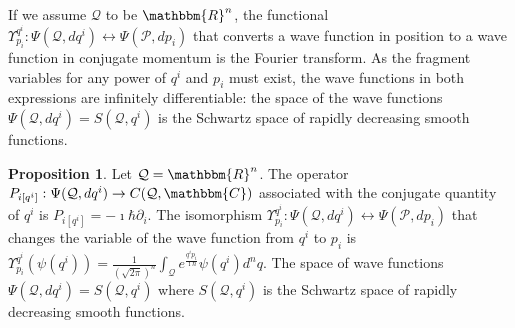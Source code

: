 \documentclass[aps,pra,10pt,twocolumn,floatfix,nofootinbib]{revtex4-1}
\numberwithin{equation}{section}
\theoremstyle{definition}
\newtheorem{prop}[equation]{Proposition}
\begin{document}
If we assume $\mathcal{Q}$ to be $\mathbbm{R}^n$, the functional $\Upsilon^{q^i}_{p_i} : \Psi(\mathcal{Q}, dq^i) \leftrightarrow \Psi(\mathcal{P}, dp_i)$ that converts a wave function in position to a wave function in conjugate momentum is the Fourier transform. As the fragment variables for any power of $q^i$ and $p_i$ must exist, the wave functions in both expressions are infinitely differentiable: the space of the wave functions $\Psi(\mathcal{Q}, dq^i) = S(\mathcal{Q}, q^i)$ is the Schwartz space of rapidly decreasing smooth functions.

\begin{prop}\label{prop:momentum_operator}
	Let $\mathcal{Q}=\mathbbm{R}^n$. The operator $P_{i [q^i]} : \Psi(\mathcal{Q}, dq^i) \rightarrow C(\mathcal{Q}, \mathbbm{C})$ associated with the conjugate quantity of $q^i$ is $P_{i [q^i]} = - \imath \hbar \partial_{i}$. The isomorphism $\Upsilon^{q^i}_{p_i} : \Psi(\mathcal{Q}, dq^i) \leftrightarrow \Psi(\mathcal{P}, dp_i)$ that changes the variable of the wave function from $q^i$ to $p_i$ is $\Upsilon^{q^i}_{p_i} (\psi(q^i)) = \frac{1}{(\sqrt{2\pi})^n} \int_{\mathcal{Q}} e^{\frac{q^i p_i }{\imath \hbar}} \psi(q^i) d^n q $. The space of wave functions $\Psi(\mathcal{Q}, dq^i) = S(\mathcal{Q}, q^i)$ where $S(\mathcal{Q}, q^i)$ is the Schwartz space of rapidly decreasing smooth functions. 
\end{prop}
\end{document}
